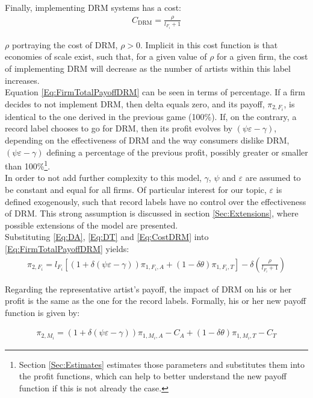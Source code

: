 \documentclass[a4paper,12pt]{article}
\numberwithin{equation}{section}
\newcommand{\drm}{\text{DRM}}
\newcommand{\artistpayoff}[2]{\pi_{#1, M_{#2}}}
\newcommand{\firmpayoff}[2]{\pi_{{#1}, F_{#2}}}
\newcommand{\artistalbum}[2]{\pi_{#1, M_{#2}, A}}
\newcommand{\artistticket}[2]{\pi_{#1, M_{#2}, T}}
\newcommand{\firmalbum}[2]{\pi_{#1, F_{#2}, A}}
\newcommand{\firmticket}[2]{\pi_{#1, F_{#2}, T}}
\newcommand{\drminf}{(\psi \varepsilon - \gamma)}
\begin{document}
Finally, implementing DRM systems has a cost:
\begin{eqnarray}
C_\drm = \frac{\rho}{l_{F_i} + 1}
\label{Eq:CostDRM}
\end{eqnarray}

$\rho$ portraying the cost of DRM, $\rho > 0$. Implicit in this cost function is that economies of scale exist, such that, for a given value of $\rho$ for a given firm, the cost of implementing DRM will decrease as the number of artists within this label increases.\\

Equation \eqref{Eq:FirmTotalPayoffDRM} can be seen in terms of percentage. If a firm decides to not implement DRM, then delta equals zero, and its payoff, $\firmpayoff{2}{i}$, is identical to the one derived in the previous game (100\%). If, on the contrary, a record label chooses to go for DRM, then its profit evolves by $\drminf$, depending on the effectiveness of DRM and the way consumers dislike DRM, $\drminf$ defining a percentage of the previous profit, possibly greater or smaller than 100\%\footnote {
Section \ref{Sec:Estimates} estimates those parameters and substitutes them into the profit functions, which can help to better understand the new payoff function if this is not already the case.
}.\\

In order to not add further complexity to this model, $\gamma$, $\psi$ and $\varepsilon$ are assumed to be constant and equal for all firms. Of particular interest for our topic, $\varepsilon$ is defined exogenously, such that record labels have no control over the effectiveness of DRM. This strong assumption is discussed in section \ref{Sec:Extensions}, where possible extensions of the model are presented.\\

Substituting \eqref{Eq:DA}, \eqref{Eq:DT} and \eqref{Eq:CostDRM} into \eqref{Eq:FirmTotalPayoffDRM} yields:
\begin{eqnarray}
\firmpayoff{2}{i} = l_{F_i} \left[
	(1 + \delta \drminf) \firmalbum{1}{i} +
	(1 - \delta \theta) \firmticket{1}{i}
\right]
- \delta \left( \frac{\rho}{l_{F_i} + 1} \right)
\end{eqnarray}

Regarding the representative artist’s payoff, the impact of DRM on his or her profit is the same as the one for the record labels. Formally, his or her new payoff function is given by:

\begin{eqnarray}
\artistpayoff{2}{i} = (1 + \delta \drminf) \artistalbum{1}{i} - C_A +
						(1 - \delta \theta) \artistticket{1}{i} - C_T
\end{eqnarray}
\end{document}
